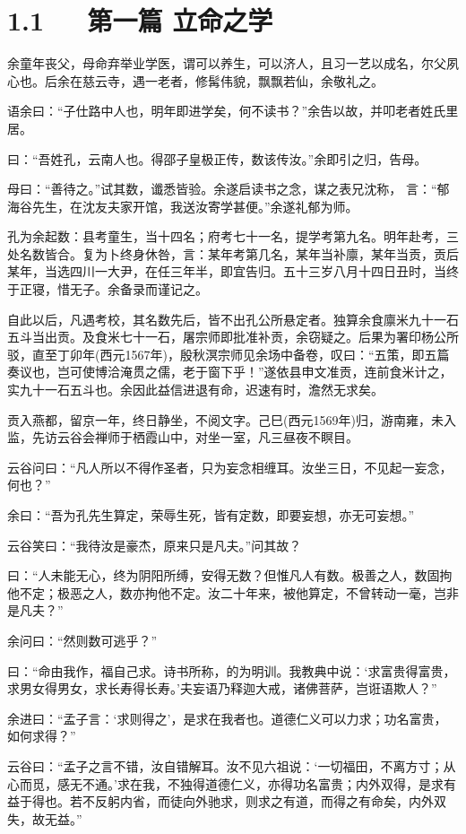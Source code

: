 \documentclass[letterpaper,12pt,english]{sphinxmanual}
\begin{document}
\section{1.1   第一篇 立命之学}
\label{\detokenize{p00_u5176_u5b83/_u8881_u4e86_u51e1-_u4e86_u51e1_u56db_u8bad:id3}}
余童年丧父，母命弃举业学医，谓可以养生，可以济人，且习一艺以成名，尔父夙心也。后余在慈云寺，遇一老者，修髯伟貌，飘飘若仙，余敬礼之。

语余曰：“子仕路中人也，明年即进学矣，何不读书？”余告以故，并叩老者姓氏里居。

曰：“吾姓孔，云南人也。得邵子皇极正传，数该传汝。”余即引之归，告母。

母曰：“善待之。”试其数，谶悉皆验。余遂启读书之念，谋之表兄沈称， 言：“郁海谷先生，在沈友夫家开馆，我送汝寄学甚便。”余遂礼郁为师。

孔为余起数：县考童生，当十四名；府考七十一名，提学考第九名。明年赴考，三处名数皆合。复为卜终身休咎，言：某年考第几名，某年当补廪，某年当贡，贡后某年，当选四川一大尹，在任三年半，即宜告归。五十三岁八月十四日丑时，当终于正寝，惜无子。余备录而谨记之。

自此以后，凡遇考校，其名数先后，皆不出孔公所悬定者。独算余食廪米九十一石五斗当出贡。及食米七十一石，屠宗师即批准补贡，余窃疑之。后果为署印杨公所驳，直至丁卯年(西元1567年)，殷秋溟宗师见余场中备卷，叹曰：“五策，即五篇奏议也，岂可使博洽淹贯之儒，老于窗下乎！”遂依县申文准贡，连前食米计之，实九十一石五斗也。余因此益信进退有命，迟速有时，澹然无求矣。

贡入燕都，留京一年，终日静坐，不阅文字。己巳(西元1569年)归，游南雍，未入监，先访云谷会禅师于栖霞山中，对坐一室，凡三昼夜不瞑目。

云谷问曰：“凡人所以不得作圣者，只为妄念相缠耳。汝坐三日，不见起一妄念，何也？”

余曰：“吾为孔先生算定，荣辱生死，皆有定数，即要妄想，亦无可妄想。”

云谷笑曰：“我待汝是豪杰，原来只是凡夫。”问其故？

曰：“人未能无心，终为阴阳所缚，安得无数？但惟凡人有数。极善之人，数固拘他不定；极恶之人，数亦拘他不定。汝二十年来，被他算定，不曾转动一毫，岂非是凡夫？”

余问曰：“然则数可逃乎？”

曰：“命由我作，福自己求。诗书所称，的为明训。我教典中说：‘求富贵得富贵，求男女得男女，求长寿得长寿。’夫妄语乃释迦大戒，诸佛菩萨，岂诳语欺人？”

余进曰：“孟子言：‘求则得之’，是求在我者也。道德仁义可以力求；功名富贵，如何求得？”

云谷曰：“孟子之言不错，汝自错解耳。汝不见六祖说：‘一切福田，不离方寸；从心而觅，感无不通。’求在我，不独得道德仁义，亦得功名富贵；内外双得，是求有益于得也。若不反躬内省，而徒向外驰求，则求之有道，而得之有命矣，内外双失，故无益。”
\end{document}
